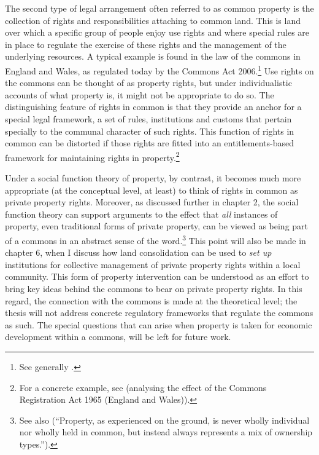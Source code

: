 The second type of legal arrangement often referred to as common property is the collection of rights and responsibilities attaching to common land. This is land over which a specific group of people enjoy use rights and where special rules are in place to regulate the exercise of these rights and the management of the underlying resources. A typical example is found in the law of the commons in England and Wales, as regulated today by the Commons Act 2006.\footnote{See generally \cite{rodgers11}.} Use rights on the commons can be thought of as property rights, but under individualistic accounts of what property is, it might not be appropriate to do so. The distinguishing feature of rights in common is that they provide an anchor for a special legal framework, a set of rules, institutions and customs that pertain specially to the communal character of such rights. This function of rights in common can be distorted if those rights are fitted into an entitlements-based framework for maintaining rights in property.\footnote{For a concrete example, see \cite[469--471]{rodgers11} (analysing the effect of the Commons Registration Act 1965 (England and Wales)).}

Under a social function theory of property, by contrast, it becomes much more appropriate (at the conceptual level, at least) to think of rights in common as private property rights. Moreover, as discussed further in chapter 2, the social function theory can support arguments to the effect that {\it all} instances of property, even traditional forms of private property, can be viewed as being part of a commons in an abstract sense of the word.\footnote{See also \cite[16-18]{fennel11} (``Property, as experienced on the ground, is never wholly individual nor wholly 
held in common, but instead always represents a mix of ownership types.'').} This point will also be made in chapter 6, when I discuss how land consolidation can be used to {\it set up} institutions for collective management of private property rights within a local community. This form of property intervention can be understood as an effort to bring key ideas behind the commons to bear on private property rights. In this regard, the connection with the commons is made at the theoretical level; the thesis will not address concrete regulatory frameworks that regulate the commons as such. The special questions that can arise when property is taken for economic development within a commons, will be left for future work.

